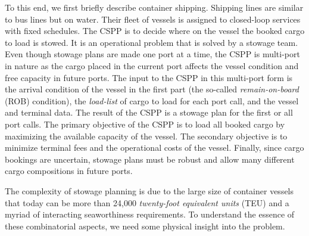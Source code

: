 \documentclass[preprint,12pt,authoryear]{elsarticle}
\begin{document}
To this end, we first briefly describe container shipping. Shipping lines are similar to bus lines but on water. Their fleet of vessels is assigned to closed-loop services with fixed schedules. %
The CSPP is to decide where on the vessel the booked cargo to load is stowed. It is an operational problem that is solved by a stowage team. Even though stowage plans are made one port at a time, the CSPP is multi-port in nature as the cargo placed in the current port affects the vessel condition and free capacity in future ports. The input to the CSPP in this multi-port form is the arrival condition of the vessel in the first part (the so-called {\em remain-on-board} (ROB) condition), the {\em load-list} of cargo to load for each port call, and the vessel and terminal data. The result of the CSPP is a stowage plan for the first or all port calls. 
The primary objective of the CSPP is to load all booked cargo by maximizing the available capacity of the vessel. The secondary objective is to minimize terminal fees and the operational costs of the vessel. Finally, since cargo bookings are uncertain, stowage plans must be robust and allow many different cargo compositions in future ports.  

The complexity of stowage planning is due to the large size of container vessels that today can be more than 24,000 {\em twenty-foot equivalent units} (TEU) and a myriad of interacting seaworthiness requirements. To understand the essence of these combinatorial aspects, we need some physical insight into the problem. 
\end{document}
